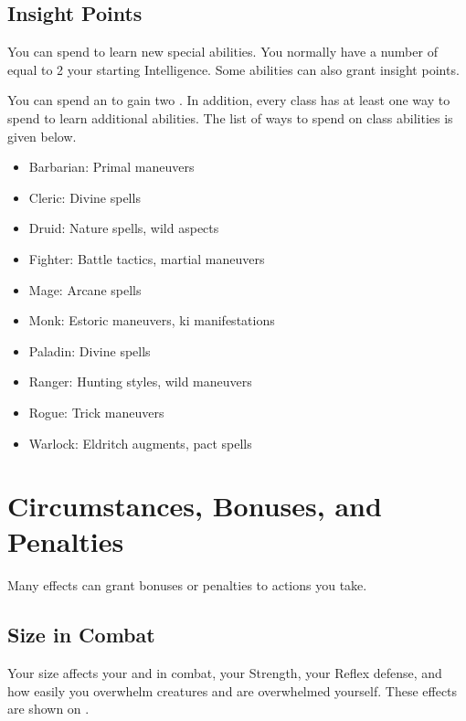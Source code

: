     \subsection{Insight Points}\label{Insight Points}
        You can spend  to learn new special abilities.
        You normally have a number of  equal to 2 \add your starting Intelligence.
        Some abilities can also grant insight points.

        You can spend an  to gain two .
        In addition, every class has at least one way to spend  to learn additional abilities.
        The list of ways to spend  on class abilities is given below.
        \begin{itemize}
            \item Barbarian: Primal maneuvers
            \item Cleric: Divine spells
            \item Druid: Nature spells, wild aspects
            \item Fighter: Battle tactics, martial maneuvers
            \item Mage: Arcane spells
            \item Monk: Estoric maneuvers, ki manifestations
            \item Paladin: Divine spells
            \item Ranger: Hunting styles, wild maneuvers
            \item Rogue: Trick maneuvers
            \item Warlock: Eldritch augments, pact spells
        \end{itemize}

\section{Circumstances, Bonuses, and Penalties}

    Many effects can grant bonuses or penalties to actions you take.

    \subsection{Size in Combat}\label{Size in Combat}
        Your size affects your  and  in combat, your Strength, your Reflex defense, and how easily you overwhelm creatures and are overwhelmed yourself.
        These effects are shown on .

